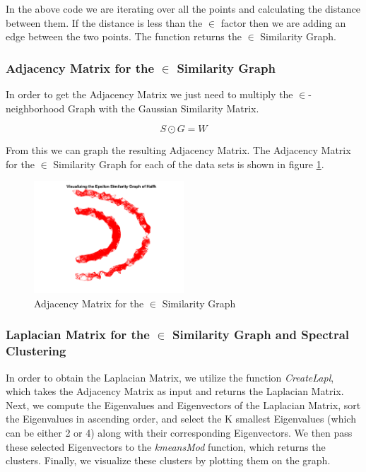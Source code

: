 \documentclass[unicode,11pt,a4paper,oneside,numbers=endperiod,openany]{scrartcl}
\begin{document}
In the above code we are iterating over all the points and calculating the distance between them. If the distance is less than the $\in$ factor then we are adding an edge between the two points. The function returns the $\in$ Similarity Graph.

\subsubsection{Adjacency Matrix for the $\in$ Similarity Graph}
In order to get the Adjacency Matrix we just need to multiply the $\in$-neighborhood Graph with the Gaussian Similarity Matrix.

\begin{equation}
    S \odot G = W
\end{equation}

From this we can graph the resulting Adjacency Matrix. The Adjacency Matrix for the $\in$ Similarity Graph for each of the data sets is shown in figure \ref{fig:1.4}.

\begin{figure}[H]
    \centering
    \includegraphics[width=0.5\textwidth]{figures/1.4.png}
    \caption{Adjacency Matrix for the $\in$ Similarity Graph}
    \label{fig:1.4}
\end{figure}

\subsubsection{Laplacian Matrix for the $\in$ Similarity Graph and Spectral Clustering}

In order to obtain the Laplacian Matrix, we utilize the function \textit{CreateLapl}, which takes the Adjacency Matrix as input and returns the Laplacian Matrix. Next, we compute the Eigenvalues and Eigenvectors of the Laplacian Matrix, sort the Eigenvalues in ascending order, and select the K smallest Eigenvalues (which can be either 2 or 4) along with their corresponding Eigenvectors. We then pass these selected Eigenvectors to the \textit{kmeansMod} function, which returns the clusters. Finally, we visualize these clusters by plotting them on the graph.
\end{document}
